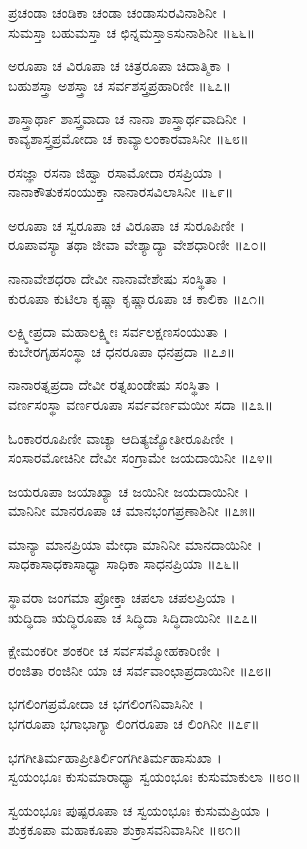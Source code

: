 ಪ್ರಚಂಡಾ ಚಂಡಿಕಾ ಚಂಡಾ ಚಂಡಾಸುರವಿನಾಶಿನೀ ।\\
ಸುಮಸ್ತಾ ಬಹುಮಸ್ತಾ ಚ ಛಿನ್ನಮಸ್ತಾಽಸುನಾಶಿನೀ ॥೬೬॥

ಅರೂಪಾ ಚ ವಿರೂಪಾ ಚ ಚಿತ್ರರೂಪಾ ಚಿದಾತ್ಮಿಕಾ ।\\
ಬಹುಶಸ್ತ್ರಾ ಅಶಸ್ತ್ರಾ ಚ ಸರ್ವಶಸ್ತ್ರಪ್ರಹಾರಿಣೀ ॥೬೭॥

ಶಾಸ್ತ್ರಾರ್ಥಾ ಶಾಸ್ತ್ರವಾದಾ ಚ ನಾನಾ ಶಾಸ್ತ್ರಾರ್ಥವಾದಿನೀ ।\\
ಕಾವ್ಯಶಾಸ್ತ್ರಪ್ರಮೋದಾ ಚ ಕಾವ್ಯಾಲಂಕಾರವಾಸಿನೀ ॥೬೮॥

ರಸಜ್ಞಾ ರಸನಾ ಜಿಹ್ವಾ ರಸಾಮೋದಾ ರಸಪ್ರಿಯಾ ।\\
ನಾನಾಕೌತುಕಸಂಯುಕ್ತಾ ನಾನಾರಸವಿಲಾಸಿನೀ ॥೬೯॥

ಅರೂಪಾ ಚ ಸ್ವರೂಪಾ ಚ ವಿರೂಪಾ ಚ ಸುರೂಪಿಣೀ ।\\
ರೂಪಾವಸ್ಯಾ ತಥಾ ಜೀವಾ ವೇಶ್ಯಾದ್ಯಾ ವೇಶಧಾರಿಣೀ ॥೭೦॥

ನಾನಾವೇಶಧರಾ ದೇವೀ ನಾನಾವೇಶೇಷು ಸಂಸ್ಥಿತಾ ।\\
ಕುರೂಪಾ ಕುಟಿಲಾ ಕೃಷ್ಣಾ ಕೃಷ್ಣಾರೂಪಾ ಚ ಕಾಲಿಕಾ ॥೭೧॥

ಲಕ್ಷ್ಮೀಪ್ರದಾ ಮಹಾಲಕ್ಷ್ಮೀಃ ಸರ್ವಲಕ್ಷಣಸಂಯುತಾ ।\\
ಕುಬೇರಗೃಹಸಂಸ್ಥಾ ಚ ಧನರೂಪಾ ಧನಪ್ರದಾ ॥೭೨॥

ನಾನಾರತ್ನಪ್ರದಾ ದೇವೀ ರತ್ನಖಂಡೇಷು ಸಂಸ್ಥಿತಾ ।\\
ವರ್ಣಸಂಸ್ಥಾ ವರ್ಣರೂಪಾ ಸರ್ವವರ್ಣಮಯೀ ಸದಾ ॥೭೩॥

ಓಂಕಾರರೂಪಿಣೀ ವಾಚ್ಯಾ ಆದಿತ್ಯಜ್ಯೋತೀರೂಪಿಣೀ ।\\
ಸಂಸಾರಮೋಚಿನೀ ದೇವೀ ಸಂಗ್ರಾಮೇ ಜಯದಾಯಿನೀ ॥೭೪॥

ಜಯರೂಪಾ ಜಯಾಖ್ಯಾ ಚ ಜಯಿನೀ ಜಯದಾಯಿನೀ ।\\
ಮಾನಿನೀ ಮಾನರೂಪಾ ಚ ಮಾನಭಂಗಪ್ರಣಾಶಿನೀ ॥೭೫॥

ಮಾನ್ಯಾ ಮಾನಪ್ರಿಯಾ ಮೇಧಾ ಮಾನಿನೀ ಮಾನದಾಯಿನೀ ।\\
ಸಾಧಕಾಸಾಧಕಾಸಾಧ್ಯಾ ಸಾಧಿಕಾ ಸಾಧನಪ್ರಿಯಾ ॥೭೬॥

ಸ್ಥಾವರಾ ಜಂಗಮಾ ಪ್ರೋಕ್ತಾ ಚಪಲಾ ಚಪಲಪ್ರಿಯಾ ।\\
ಋದ್ಧಿದಾ ಋದ್ಧಿರೂಪಾ ಚ ಸಿದ್ಧಿದಾ ಸಿದ್ಧಿದಾಯಿನೀ ॥೭೭॥

ಕ್ಷೇಮಂಕರೀ ಶಂಕರೀ ಚ ಸರ್ವಸಮ್ಮೋಹಕಾರಿಣೀ ।\\
ರಂಜಿತಾ ರಂಜಿನೀ ಯಾ ಚ ಸರ್ವವಾಂಛಾಪ್ರದಾಯಿನೀ ॥೭೮॥

ಭಗಲಿಂಗಪ್ರಮೋದಾ ಚ ಭಗಲಿಂಗನಿವಾಸಿನೀ ।\\
ಭಗರೂಪಾ ಭಗಾಭಾಗ್ಯಾ ಲಿಂಗರೂಪಾ ಚ ಲಿಂಗಿನೀ ॥೭೯॥

ಭಗಗೀತಿರ್ಮಹಾಪ್ರೀತಿರ್ಲಿಂಗಗೀತಿರ್ಮಹಾಸುಖಾ ।\\
ಸ್ವಯಂಭೂಃ ಕುಸುಮಾರಾಧ್ಯಾ ಸ್ವಯಂಭೂಃ ಕುಸುಮಾಕುಲಾ ॥೮೦॥

ಸ್ವಯಂಭೂಃ ಪುಷ್ಪರೂಪಾ ಚ ಸ್ವಯಂಭೂಃ ಕುಸುಮಪ್ರಿಯಾ ।\\
ಶುಕ್ರಕೂಪಾ ಮಹಾಕೂಪಾ ಶುಕ್ರಾಸವನಿವಾಸಿನೀ ॥೮೧॥

